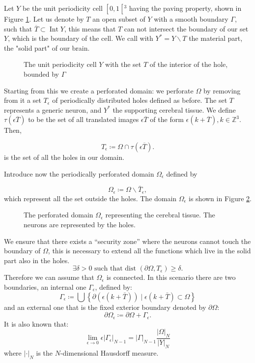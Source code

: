 Let $Y$ be the unit periodicity cell $\left[0,1\left[{ }^{3}\right.\right.$ having the paving property, shown in Figure \ref{fig:unit_cell}. 
Let us denote by $T$ an open subset of $Y$ with a smooth boundary $\Gamma$, such that $\overline{T} \subset \operatorname{Int} Y$, this means that $T$ can not intersect the boundary of our set $Y$, which is the boundary of the cell. We call with $Y^{*}=Y \backslash T$ the material part, the "solid part" of our brain. 
\begin{figure}[H]
    \centering
    \caption{The unit periodicity cell $Y$ with the set $T$ of the interior of the hole, bounded by \(\Gamma\)}
    \label{fig:unit_cell}
  \end{figure}

Starting from this we create a perforated domain: we perforate $\Omega$ by removing from it a set $T_{\epsilon}$ of periodically distributed holes defined as before. The set $T$ represents a generic neuron, and $Y^{*}$ the supporting cerebral tissue. We define $\tau(\epsilon \overline{T})$ to be the set of all translated images $\epsilon \overline{T}$ of the form $\epsilon(k+\overline{T}), k \in \mathbb{Z}^{3}$. Then,

\[ T_{\epsilon} \coloneqq \Omega \cap \tau(\epsilon \overline{T}) . \] is the set of all the holes in our domain.

Introduce now the periodically perforated domain $\Omega_{\epsilon}$ defined by

$$
\Omega_{\epsilon} \coloneqq \Omega \backslash \bar{T}_{\epsilon},
$$
which represent all the set outside the holes. The domain $\Omega_{\epsilon}$ is shown in Figure \ref{fig:perforated_domain}.
\begin{figure}[H]
    \centering
    \caption{The perforated domain $\Omega_\epsilon$ representing the cerebral tissue. The neurons are represented by the holes.}
    \label{fig:perforated_domain}
  \end{figure}

We ensure that there exists a ``security zone'' where the neurons cannot touch the boundary of \(\Omega\), this is necessary to extend all the functions which live in the solid part also in the holes.
\begin{equation}
  \exists \delta>0 \text { such that dist }\left(\partial\Omega, T_{\epsilon}\right)\geq\delta.
\label{eq:security_zone}
\end{equation}
Therefore we can assume that $\Omega_{\epsilon}$ is connected. In this scenario there are two boundaries, an internal one $\Gamma_{\epsilon}$, defined by:
$$
\Gamma_{\epsilon} \coloneqq \bigcup\left\{\partial(\epsilon(k+\bar{T})) \mid \epsilon(k+\bar{T}) \subset \Omega\right\}
$$
and an external one that is the fixed exterior boundary denoted by $\partial \Omega$:
$$
\partial\Omega_{\epsilon}\coloneqq\partial\Omega+\Gamma_{\epsilon}.
$$
It is also known that:
\begin{equation}
  \lim _{\epsilon \rightarrow 0} \epsilon\left|\Gamma_{\epsilon}\right|_{N-1}=|\Gamma|_{N-1} \frac{|\Omega|_{N}}{|Y|_{N}}
\label{eq:limit_gamma_eps}
\end{equation}
where $|\cdot|_{N}$ is the $N$-dimensional Hausdorff measure.

